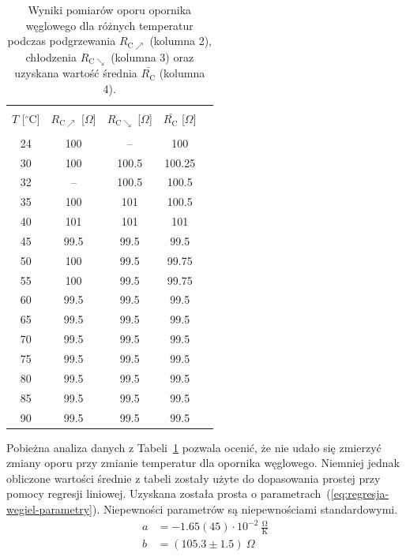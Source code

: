 \documentclass[twocolumn, a4paper, polish, 10pt]{article}
\newcommand{\RC}{\ensuremath{ R_{\mathrm{C}} }}
\begin{document}
\begin{table}[ht]
\begin{center}
\renewcommand*{\tablename}{Tabela}
\caption{\small
Wyniki pomiarów oporu opornika węglowego dla różnych temperatur podczas podgrzewania $R_{\mathrm{C \nearrow}}$ (kolumna 2), chłodzenia $R_{\mathrm{C \searrow}}$ (kolumna 3) oraz uzyskana wartość średnia $\bar{\RC}$ (kolumna 4).
\vspace{0.15cm}
    \label{tab:opornik-weglowy-pomiary}}
    {\small
    \begin{tabular}{c c c c c}
    \hline \vspace{-0.35cm} \\
      $T$ [$^{\circ}$C] & $R_{\mathrm{C\nearrow}}$ [$\Omega$] & $R_{\mathrm{C\searrow}}$ [$\Omega$] & $\bar{\RC}$ [$\Omega$] \\
      \hline \vspace{-0.2cm} \\
        24 & 100  & --    & 100    \\
        30 & 100  & 100.5 & 100.25 \\
        32 & --   & 100.5 & 100.5  \\
        35 & 100  & 101   & 100.5  \\
        40 & 101  & 101   & 101    \\
        45 & 99.5 & 99.5  & 99.5   \\
        50 & 100  & 99.5  & 99.75  \\
        55 & 100  & 99.5  & 99.75  \\
        60 & 99.5 & 99.5  & 99.5   \\
        65 & 99.5 & 99.5  & 99.5   \\
        70 & 99.5 & 99.5  & 99.5   \\
        75 & 99.5 & 99.5  & 99.5   \\
        80 & 99.5 & 99.5  & 99.5   \\
        85 & 99.5 & 99.5  & 99.5   \\
        90 & 99.5 & 99.5  & 99.5   \\
    \hline
    \end{tabular}}
    \end{center}
\end{table}

Pobieżna analiza danych z Tabeli~\ref{tab:opornik-weglowy-pomiary} pozwala ocenić, że nie udało się zmierzyć zmiany oporu przy zmianie temperatur dla opornika węglowego. Niemniej jednak obliczone wartości średnie z tabeli zostały użyte do dopasowania prostej przy pomocy regresji liniowej. Uzyskana została prosta o parametrach~(\ref{eq:regresja-wegiel-parametry}). Niepewności parametrów są niepewnościami standardowymi.
\begin{equation}
\begin{split}
    a &= -1.65(45) \cdot 10^{-2}~\mathrm{\frac{\Omega}{K}} \\
    b &= (105.3 \pm 1.5)~\Omega
    \label{eq:regresja-wegiel-parametry}
\end{split}
\end{equation}
\end{document}
